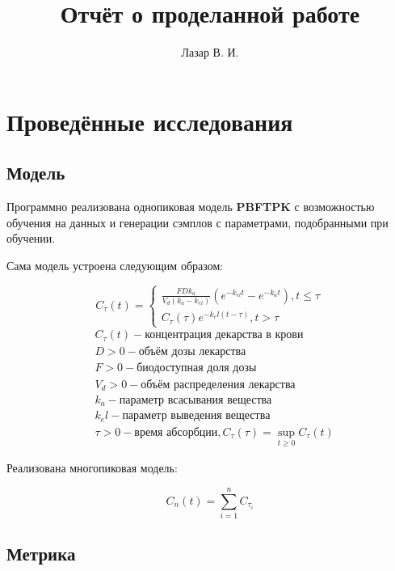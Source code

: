 \documentclass{article}
\title{Отчёт о проделанной работе}
\author{Лазар В. И.}
\begin{document}
\maketitle

\section{Проведённые исследования}

\subsection{Модель}

Программно реализована однопиковая модель \textbf{PBFTPK} с возможностью обучения на данных и генерации сэмплов с параметрами, подобранными при обучении. \newline

Сама модель устроена следующим образом:

$$
	C_{\tau}(t) = \begin{cases}
		\frac{F D k_a}{V_d (k_a - k_{el})} (e^{-k_{el} t} - e^{-k_a t}), t \le \tau \\
		C_{\tau}(\tau)e^{-k_el (t - \tau)}, t > \tau
	\end{cases}
$$
\begin{align*}
	 & C_{\tau}(t) - \text{концентрация декарства в крови}                            \\
	 & D > 0 - \text{объём дозы лекарства}                                            \\
	 & F > 0 - \text{биодоступная доля дозы}                                          \\
	 & V_d > 0 - \text{объём распределения лекарства}                                 \\
	 & k_a - \text{параметр всасывания вещества}                                      \\
	 & k_el - \text{параметр выведения вещества}                                      \\
	 & \tau > 0 - \text{время абсорбции}, C_{\tau}(\tau) = \sup_{t \ge 0} C_{\tau}(t)
\end{align*}

Реализована многопиковая модель:

$$
	C_n(t) = \sum_{i=1}^{n} C_{\tau_i}
$$


\subsection{Метрика}
\end{document}
